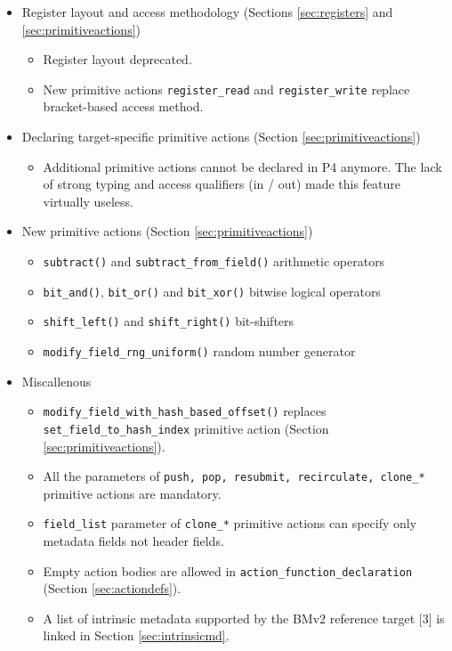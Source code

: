\documentclass[12pt]{article}
\begin{document}
\begin{itemize}
\begin{itemize}
\item Register layout and access methodology (Sections \ref{sec:registers} and \ref{sec:primitiveactions})
  \begin{itemize}
  \item Register layout deprecated.  
  \item New primitive actions \texttt{register_read} and \texttt{register_write} replace bracket-based access method. 
  \end{itemize}

\item Declaring target-specific primitive actions (Section \ref{sec:primitiveactions})
  \begin{itemize}
  \item Additional primitive actions cannot be declared in P4 anymore. The lack
  of strong typing and access qualifiers (in / out) made this feature virtually
  useless.
  \end{itemize}

\item New primitive actions (Section \ref{sec:primitiveactions})
  \begin{itemize}
  \item \texttt{subtract()} and \texttt{subtract_from_field()} arithmetic operators
  \item \texttt{bit_and()}, \texttt{bit_or()} and \texttt{bit_xor()} bitwise logical operators
  \item \texttt{shift_left()} and \texttt{shift_right()} bit-shifters 
  \item \texttt{modify_field_rng_uniform()} random number generator
  \end{itemize}

\item Miscallenous 
  \begin{itemize}
  \item \texttt{modify_field_with_hash_based_offset()} replaces \texttt{set_field_to_hash_index} primitive action (Section \ref{sec:primitiveactions}).
  \item All the parameters of \texttt{push, pop, resubmit, recirculate, clone_*} primitive actions are mandatory.
  \item \texttt{field_list} parameter of \texttt{clone_*} primitive actions can specify only metadata fields not header fields.
  \item Empty action bodies are allowed in \texttt{action_function_declaration} (Section \ref{sec:actiondefs}).
  \item A list of intrinsic metadata supported by the BMv2 reference target [3] is linked in Section \ref{sec:intrinsicmd}.
  \end{itemize}


\end{itemize}
\end{itemize}
\end{document}
